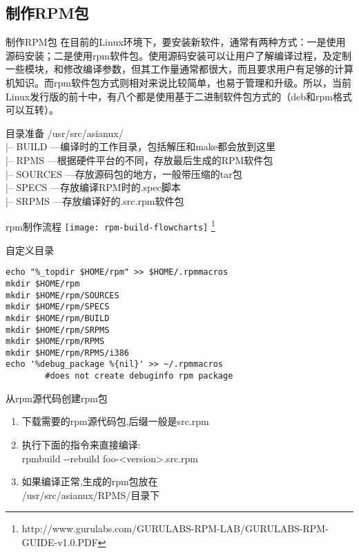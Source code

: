 \subsection{制作RPM包}

\begin{frame}{制作RPM包}
在目前的Linux环境下，要安装新软件，通常有两种方式：一是使用源码安装；二是使用rpm软件包。使用源码安装可以让用户了解编译过程，及定制一些模块，和修改编译参数，但其工作量通常都很大，而且要求用户有足够的计算机知识。而rpm软件包方式则相对来说比较简单，也易于管理和升级。所以，当前Linux发行版的前十中，有八个都是使用基于二进制软件包方式的（deb和rpm格式可以互转）。
\end{frame}

\begin{frame}{目录准备}
/usr/src/asianux/ \\
|-- BUILD   ---编译时的工作目录，包括解压和make都会放到这里 \\
|-- RPMS   ---根据硬件平台的不同，存放最后生成的RPM软件包 \\
|-- SOURCES ---存放源码包的地方，一般带压缩的tar包 \\
|-- SPECS ---存放编译RPM时的.spec脚本 \\
|-- SRPMS ---存放编译好的.src.rpm软件包 \\
\end{frame}

\begin{frame}[plain]{rpm制作流程}
\texttt{[image: rpm-build-flowcharts]} \footnote{http://www.gurulabs.com/GURULABS-RPM-LAB/GURULABS-RPM-GUIDE-v1.0.PDF}
\end{frame}

\begin{frame}[fragile]{自定义目录}
\begin{verbatim}
echo "%_topdir $HOME/rpm" >> $HOME/.rpmmacros
mkdir $HOME/rpm
mkdir $HOME/rpm/SOURCES
mkdir $HOME/rpm/SPECS
mkdir $HOME/rpm/BUILD
mkdir $HOME/rpm/SRPMS
mkdir $HOME/rpm/RPMS
mkdir $HOME/rpm/RPMS/i386
echo '%debug_package %{nil}' >> ~/.rpmmacros  
		#does not create debuginfo rpm package
\end{verbatim}
\end{frame}

\begin{frame}{从rpm源代码创建rpm包}
\begin{enumerate}
\item  下载需要的rpm源代码包,后缀一般是src.rpm
\item 执行下面的指令来直接编译: \\
rpmbuild -{}-rebuild foo-<version>.src.rpm
\item 如果编译正常,生成的rpm包放在 \\
/usr/src/asianux/RPMS/目录下
\end{enumerate}
\end{frame}


